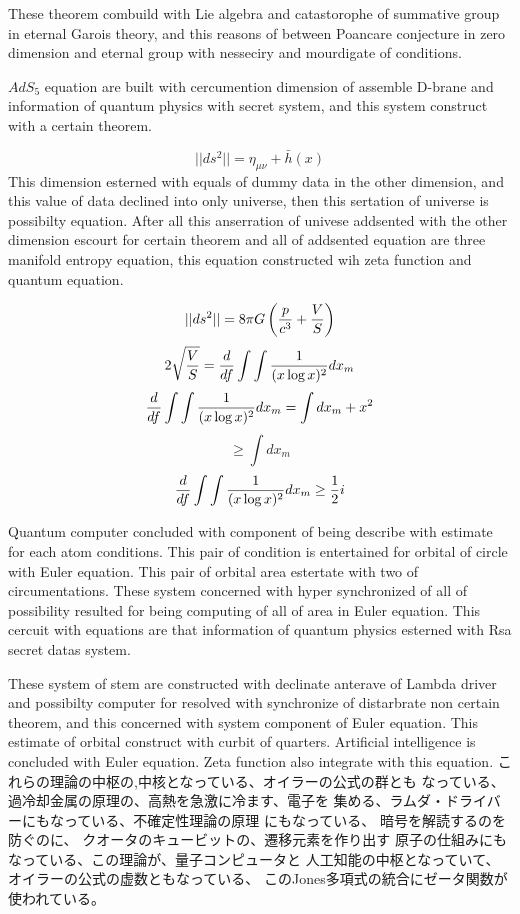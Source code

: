 \documentclass{jsarticle}
\begin{document}
   These theorem combuild with Lie algebra and catastorophe  
   of summative group in eternal Garois theory,
   and this reasons of between Poancare conjecture in zero dimension 
   and eternal group with nesseciry and mourdigate of conditions.


   $ AdS_5 $ equation are built with cercumention dimension of assemble
   D-brane and information of quantum physics with secret system,
   and this system construct with a certain theorem.

   $$ ||ds^2|| = \eta_{\mu\nu} + \bar{h}(x) $$ 
   This dimension esterned with equals of dummy data in the other dimension,
   and this value of data declined into only universe,
   then this sertation of universe is possibilty equation.
   After all this anserration of univese addsented with the other dimension
   escourt for certain theorem and all of addsented equation
   are three manifold entropy equation,
   this equation constructed wih zeta function and quantum equation.

   $$ ||ds^2|| = 8 \pi G \left({p \over c^3} + {V \over S}\right) $$
   $$ 2 \sqrt{V \over S}= {d \over df}\int \int{1 \over (x \log x)^2}dx_m $$
   $$ {d \over df} \int \int{ 1 \over (x \log x)^2}dx_m = \int dx_m + x^2 $$
   $$ \ge \int dx_m $$
   $$ {d \over df} \int \int{1 \over (x \log x)^2}dx_m \ge {1 \over 2}i $$

     Quantum computer concluded with component of being describe with 
     estimate for each atom conditions. This pair of condition is
     entertained for orbital of circle with Euler equation.
     This pair of orbital area estertate with two of circumentations.
     These system concerned with hyper synchronized of all of possibility
     resulted for being computing of all of area in Euler equation.
     This cercuit with equations are that information of quantum physics
     esterned with Rsa secret datas system.


     These system of stem are constructed with declinate anterave of
     Lambda driver and possibilty computer for resolved with synchronize
     of distarbrate non certain theorem, and this concerned with
     system component of Euler equation.
     This estimate of orbital construct with curbit of quarters.
     Artificial intelligence is concluded with Euler equation.
     Zeta function also integrate with this equation.
     これらの理論の中枢の,中核となっている、オイラーの公式の群とも
     なっている、過冷却金属の原理の、高熱を急激に冷ます、電子を
     集める、ラムダ・ドライバーにもなっている、不確定性理論の原理
     にもなっている、 暗号を解読するのを防ぐのに、
     クオータのキュービットの、遷移元素を作り出す
     原子の仕組みにもなっている、この理論が、量子コンピュータと
     人工知能の中枢となっていて、オイラーの公式の虚数ともなっている、
     このJones多項式の統合にゼータ関数が使われている。
 
\end{document}
